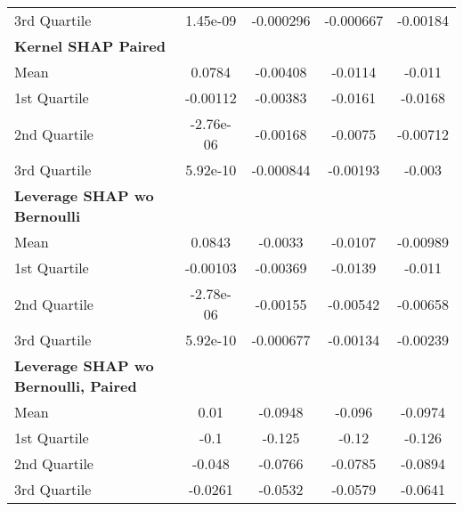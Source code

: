 {\begin{tabular} {lcccc}
\hspace{7pt}3rd Quartile & 1.45e-09 & -0.000296 & -0.000667 & -0.00184 \\ 
\addlinespace[1ex] 
\textbf{Kernel SHAP Paired} &  &  &  &  \\ 
\hspace{7pt}Mean & 0.0784 & -0.00408 & -0.0114 & -0.011 \\ 
\hspace{7pt}1st Quartile & -0.00112 & -0.00383 & -0.0161 & -0.0168 \\ 
\hspace{7pt}2nd Quartile & -2.76e-06 & -0.00168 & -0.0075 & -0.00712 \\ 
\hspace{7pt}3rd Quartile & 5.92e-10 & -0.000844 & -0.00193 & -0.003 \\ 
\addlinespace[1ex] 
\textbf{Leverage SHAP wo Bernoulli} &  &  &  &  \\ 
\hspace{7pt}Mean & 0.0843 & -0.0033 & -0.0107 & -0.00989 \\ 
\hspace{7pt}1st Quartile & -0.00103 & -0.00369 & -0.0139 & -0.011 \\ 
\hspace{7pt}2nd Quartile & -2.78e-06 & -0.00155 & -0.00542 & -0.00658 \\ 
\hspace{7pt}3rd Quartile & \cellcolor{bronze!60}5.92e-10 & -0.000677 & -0.00134 & -0.00239 \\ 
\addlinespace[1ex] 
\textbf{Leverage SHAP wo Bernoulli, Paired} &  &  &  &  \\ 
\hspace{7pt}Mean & \cellcolor{silver!60}0.01 & \cellcolor{silver!60}-0.0948 & \cellcolor{silver!60}-0.096 & \cellcolor{silver!60}-0.0974 \\ 
\hspace{7pt}1st Quartile & \cellcolor{silver!60}-0.1 & \cellcolor{silver!60}-0.125 & \cellcolor{silver!60}-0.12 & \cellcolor{silver!60}-0.126 \\ 
\hspace{7pt}2nd Quartile & \cellcolor{silver!60}-0.048 & \cellcolor{silver!60}-0.0766 & \cellcolor{silver!60}-0.0785 & \cellcolor{silver!60}-0.0894 \\ 
\hspace{7pt}3rd Quartile & \cellcolor{silver!60}-0.0261 & \cellcolor{silver!60}-0.0532 & \cellcolor{silver!60}-0.0579 & \cellcolor{silver!60}-0.0641 \\ 

\end{tabular}}
